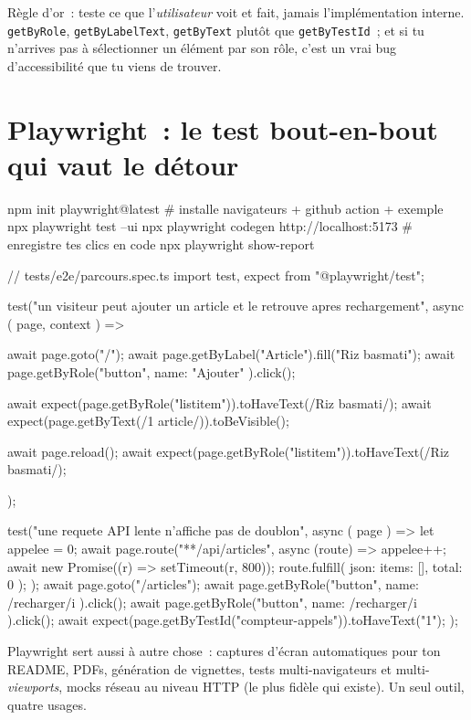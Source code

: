 \documentclass[12pt,a4paper,twoside,openright]{book}
\begin{document}
R\`egle d'or~: teste ce que l'\emph{utilisateur} voit et fait, jamais l'impl\'ementation interne.
\verb|getByRole|, \verb|getByLabelText|, \verb|getByText| plut\^ot que \verb|getByTestId|~; et si
tu n'arrives pas \`a s\'electionner un \'el\'ement par son r\^ole, c'est un vrai bug d'accessibilit\'e
que tu viens de trouver.

\section{Playwright~: le test bout-en-bout qui vaut le d\'etour}

\begin{terminal}
npm init playwright@latest         # installe navigateurs + github action + exemple
npx playwright test --ui
npx playwright codegen http://localhost:5173   # enregistre tes clics en code
npx playwright show-report
\end{terminal}

\begin{codejs}
// tests/e2e/parcours.spec.ts
import { test, expect } from "@playwright/test";

test("un visiteur peut ajouter un article et le retrouve apres rechargement", async ({ page, context }) => {
  await page.goto("/");
  await page.getByLabel("Article").fill("Riz basmati");
  await page.getByRole("button", { name: "Ajouter" }).click();

  await expect(page.getByRole("listitem")).toHaveText(/Riz basmati/);
  await expect(page.getByText(/1 article/)).toBeVisible();

  await page.reload();
  await expect(page.getByRole("listitem")).toHaveText(/Riz basmati/);
});

test("une requete API lente n'affiche pas de doublon", async ({ page }) => {
  let appelee = 0;
  await page.route("**/api/articles", async (route) => {
    appelee++;
    await new Promise((r) => setTimeout(r, 800));
    route.fulfill({ json: { items: [], total: 0 } });
  });
  await page.goto("/articles");
  await page.getByRole("button", { name: /recharger/i }).click();
  await page.getByRole("button", { name: /recharger/i }).click();
  await expect(page.getByTestId("compteur-appels")).toHaveText("1");
});
\end{codejs}

\begin{note}
Playwright sert aussi \`a autre chose~: captures d'\'ecran automatiques pour ton README,
PDFs, g\'en\'eration de vignettes, tests multi-navigateurs et multi-\emph{viewports},
mocks r\'eseau au niveau HTTP (le plus fid\`ele qui existe). Un seul outil, quatre usages.
\end{note}
\end{document}
